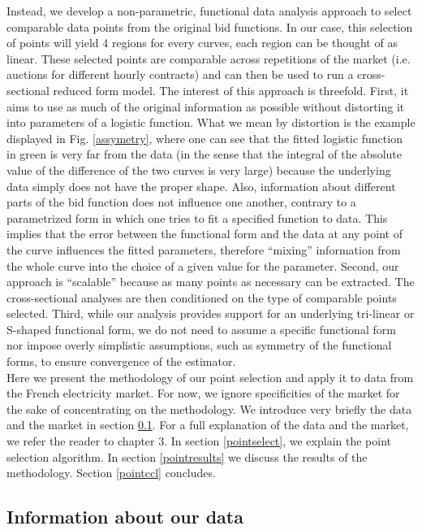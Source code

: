 Instead, we develop a non-parametric, functional data analysis approach to select comparable data points from the original bid functions. In our case, this selection of points will yield 4 regions for every curves, each region can be thought of as linear. These selected points are comparable across repetitions of the market (i.e. auctions for different hourly contracts) and can then be used to run a cross-sectional reduced form model. The interest of this approach is threefold. First, it aims to use as much of the original information as possible without distorting it into parameters of a logistic function. What we mean by distortion is the example displayed in Fig. \ref{assymetry}, where one can see that the fitted logistic function in green is very far from the data (in the sense that the integral of the absolute value of the difference of the two curves is very large) because the underlying data simply does not have the proper shape. Also, information about different parts of the bid function does not influence one another, contrary to a parametrized form in which one tries to fit a specified function to data. This implies that the error between the functional form and the data at any point of the curve influences the fitted parameters, therefore ``mixing'' information from the whole curve into the choice of a given value for the parameter. Second, our approach is “scalable” because as many points as necessary can be extracted. The cross-sectional analyses are then conditioned on the type of comparable points selected. Third, while our analysis provides support for an underlying tri-linear or S-shaped functional form, we do not need to assume a specific functional form nor impose overly simplistic assumptions, such as symmetry of the functional forms, to ensure convergence of the estimator.\\

Here we present the methodology of our point selection and apply it to data from the French electricity market. For now, we ignore specificities of the market for the sake of concentrating on the methodology. We introduce very briefly the data and the market in section \ref{gleinfo}. For a full explanation of the data and the market, we refer the reader to chapter 3. In section \ref{pointselect}, we explain the point selection algorithm. In section \ref{pointresults} we discuss the results of the methodology. Section \ref{pointccl} concludes.

\subsection{Information about our data}\label{gleinfo}

